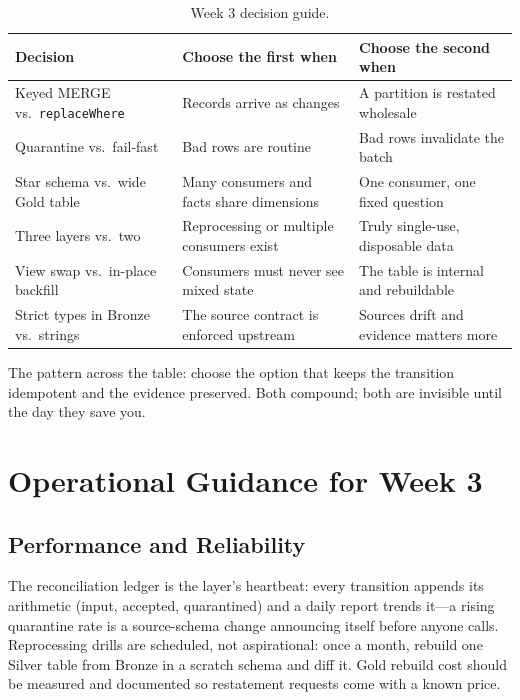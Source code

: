 \begin{table}[H]
\centering
\small
\begin{tabular}{@{}p{3.4cm}p{4.4cm}p{4.6cm}@{}}
\toprule
\textbf{Decision} & \textbf{Choose the first when} & \textbf{Choose the second when} \\
\midrule
Keyed MERGE vs.\ \texttt{replaceWhere} & Records arrive as changes & A partition is restated wholesale \\
Quarantine vs.\ fail-fast & Bad rows are routine & Bad rows invalidate the batch \\
Star schema vs.\ wide Gold table & Many consumers and facts share dimensions & One consumer, one fixed question \\
Three layers vs.\ two & Reprocessing or multiple consumers exist & Truly single-use, disposable data \\
View swap vs.\ in-place backfill & Consumers must never see mixed state & The table is internal and rebuildable \\
Strict types in Bronze vs.\ strings & The source contract is enforced upstream & Sources drift and evidence matters more \\
\bottomrule
\end{tabular}
\caption{Week 3 decision guide.}
\label{tab:ch3-decisions}
\end{table}

The pattern across the table: choose the option that keeps the transition idempotent and the evidence preserved. Both compound; both are invisible until the day they save you.

\section{Operational Guidance for Week 3}
%
\subsection{Performance and Reliability}
The reconciliation ledger is the layer's heartbeat: every transition appends its arithmetic (input, accepted, quarantined) and a daily report trends it---a rising quarantine rate is a source-schema change announcing itself before anyone calls. Reprocessing drills are scheduled, not aspirational: once a month, rebuild one Silver table from Bronze in a scratch schema and diff it. Gold rebuild cost should be measured and documented so restatement requests come with a known price.

